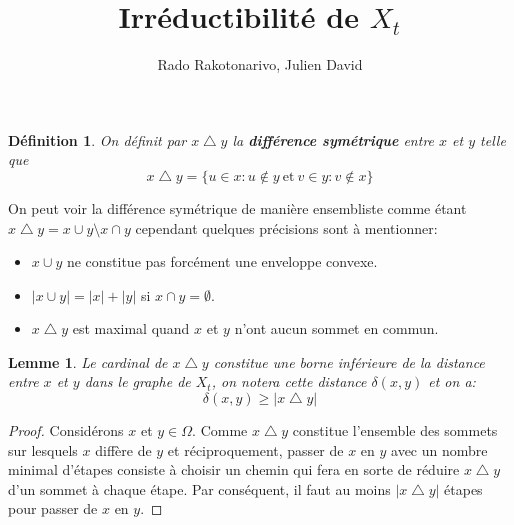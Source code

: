\documentclass[11pt]{article}
\newtheorem{definition}{Définition}[subsection]
\newtheorem{lemme}{Lemme}[subsection]
\begin{document}
\title{Irréductibilité de $X_t$}
\author{Rado Rakotonarivo, Julien David}
\maketitle

\begin{definition}
  On définit par $x \bigtriangleup y$ la \textbf{différence symétrique} entre $x$ et $y$ telle que
  \begin{equation}
    x \bigtriangleup y = \{ u \in x : u \notin y \ \mbox{et} \ v \in y : v \notin x \}
  \end{equation}
\end{definition}

On peut voir la différence symétrique de manière ensembliste comme étant $x \bigtriangleup y = x \cup y \setminus x \cap y$ cependant quelques précisions sont à mentionner:

\begin{itemize}
  \item $x \cup y$ ne constitue pas forcément une enveloppe convexe.
  \item $|x \cup y| = |x| + |y|$ si $x \cap y = \emptyset$.
  \item $x \bigtriangleup y$ est maximal quand $x$ et $y$ n'ont aucun sommet en commun.
\end{itemize}

\begin{lemme}
  Le cardinal de $x \bigtriangleup y$ constitue une borne inférieure de la distance entre $x$ et $y$ dans le graphe de $X_t$, on notera cette distance $\delta(x,y)$ et on a:
  \begin{equation}
    \delta(x,y) \geq{|x \bigtriangleup y|}
  \end{equation}
\end{lemme}

\begin{proof}
  Considérons $x$ et $y \in \Omega$. Comme $x \bigtriangleup y$ constitue l'ensemble des sommets sur lesquels $x$ diffère de $y$ et réciproquement, passer de $x$ en $y$ avec un nombre minimal d'étapes consiste à choisir un chemin qui fera en sorte de réduire $x \bigtriangleup y$ d'un sommet à chaque étape. Par conséquent, il faut au moins $|x \bigtriangleup y|$ étapes pour passer de $x$ en $y$.
\end{proof}

%
\end{document}
